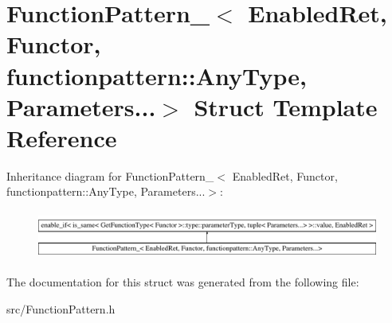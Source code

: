 \hypertarget{struct_function_pattern___3_01_enabled_ret_00_01_functor_00_01functionpattern_1_1_any_type_00_01_parameters_8_8_8_4}{\section{Function\-Pattern\-\_\-$<$ Enabled\-Ret, Functor, functionpattern\-:\-:Any\-Type, Parameters...$>$ Struct Template Reference}
\label{struct_function_pattern___3_01_enabled_ret_00_01_functor_00_01functionpattern_1_1_any_type_00_01_parameters_8_8_8_4}
}
Inheritance diagram for Function\-Pattern\-\_\-$<$ Enabled\-Ret, Functor, functionpattern\-:\-:Any\-Type, Parameters...$>$\-:\begin{figure}[H]
\begin{center}
\leavevmode
\includegraphics[height=1.620839cm]{struct_function_pattern___3_01_enabled_ret_00_01_functor_00_01functionpattern_1_1_any_type_00_01_parameters_8_8_8_4}
\end{center}
\end{figure}


The documentation for this struct was generated from the following file\-:\begin{DoxyCompactItemize}
\item 
src/Function\-Pattern.\-h\end{DoxyCompactItemize}
